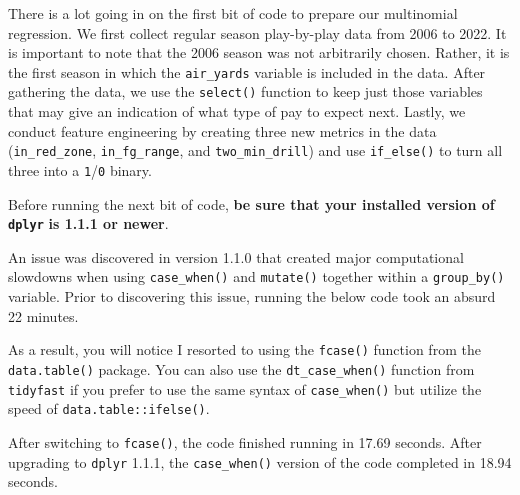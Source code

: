 \documentclass[
  letterpaper,
]{krantz}
\begin{document}
There is a lot going in on the first bit of code to prepare our
multinomial regression. We first collect regular season play-by-play
data from 2006 to 2022. It is important to note that the 2006 season was
not arbitrarily chosen. Rather, it is the first season in which the
\texttt{air\_yards} variable is included in the data. After gathering
the data, we use the \texttt{select()} function to keep just those
variables that may give an indication of what type of pay to expect
next. Lastly, we conduct feature engineering by creating three new
metrics in the data (\texttt{in\_red\_zone}, \texttt{in\_fg\_range}, and
\texttt{two\_min\_drill}) and use \texttt{if\_else()} to turn all three
into a \texttt{1}/\texttt{0} binary.

\begin{tcolorbox}[enhanced jigsaw, left=2mm, toprule=.15mm, opacitybacktitle=0.6, leftrule=.75mm, bottomrule=.15mm, colbacktitle=quarto-callout-warning-color!10!white, breakable, colback=white, bottomtitle=1mm, toptitle=1mm, title=\textcolor{quarto-callout-warning-color}{\faExclamationTriangle}\hspace{0.5em}{Warning}, coltitle=black, titlerule=0mm, arc=.35mm, opacityback=0, colframe=quarto-callout-warning-color-frame, rightrule=.15mm]

Before running the next bit of code, \textbf{be sure that your installed
version of \texttt{dplyr}} \textbf{is 1.1.1 or newer}.

An issue was discovered in version 1.1.0 that created major
computational slowdowns when using \texttt{case\_when()} and
\texttt{mutate()} together within a \texttt{group\_by()} variable. Prior
to discovering this issue, running the below code took an absurd 22
minutes.

As a result, you will notice I resorted to using the \texttt{fcase()}
function from the \texttt{data.table()} package. You can also use the
\texttt{dt\_case\_when()} function from \texttt{tidyfast} if you prefer
to use the same syntax of \texttt{case\_when()} but utilize the speed of
\texttt{data.table::ifelse()}.

After switching to \texttt{fcase()}, the code finished running in 17.69
seconds. After upgrading to \texttt{dplyr} 1.1.1, the
\texttt{case\_when()} version of the code completed in 18.94 seconds.

\end{tcolorbox}
\end{document}
